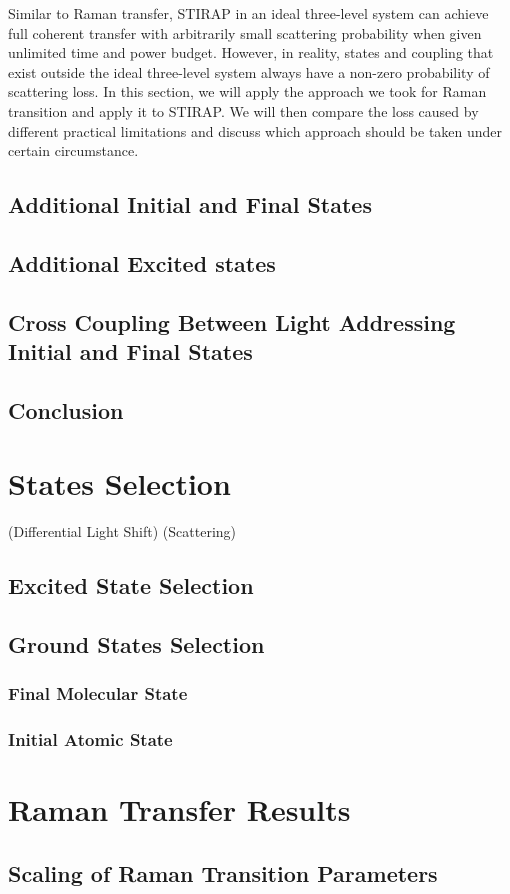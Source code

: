 Similar to Raman transfer, STIRAP in an ideal three-level system can achieve
full coherent transfer with arbitrarily small scattering probability
when given unlimited time and power budget.
However, in reality, states and coupling that exist outside the ideal three-level system
always have a non-zero probability of scattering loss.
In this section, we will apply the approach we took for Raman transition
and apply it to STIRAP. We will then compare the loss caused by different practical limitations
and discuss which approach should be taken under certain circumstance.


\subsection{Additional Initial and Final States}

\subsection{Additional Excited states}

\subsection{Cross Coupling Between Light Addressing Initial and Final States}

\subsection{Conclusion}

\section{States Selection}

(Differential Light Shift)
(Scattering)

\subsection{Excited State Selection}

\subsection{Ground States Selection}

\subsubsection{Final Molecular State}

\subsubsection{Initial Atomic State}

\section{Raman Transfer Results}

\subsection{Scaling of Raman Transition Parameters}
